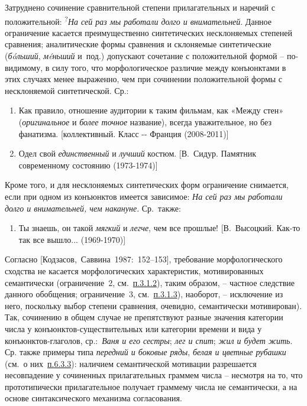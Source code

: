 Затруднено сочинение сравнительной степени прилагательных и наречий с
положительной: \textsuperscript{?}\emph{На сей раз мы работали долго и
внимательней}. Данное ограничение касается преимущественно синтетических
несклоняемых степеней сравнения; аналитические формы сравнения и
склоняемые синтетические (\emph{бóльший}, \emph{мéньший} и~под.)
допускают сочетание с положительной формой -- по-видимому, в силу того,
что морфологическое различие между конъюнктами в этих случаях менее
выраженно, чем при сочинении положительной формы с несклоняемой
синтетической. Ср.:

\begin{enumerate}
\def\labelenumi{(\arabic{enumi})}
\setcounter{enumi}{6}
\item
  Как правило, отношение аудитории к таким фильмам, как «Между стен»
  (\emph{оригинальное} и \emph{более точное} название), всегда
  уважительное, но без фанатизма. {[}коллективный. Класс -\/- Франция
  (2008-2011){]}
\item
  Одел свой \emph{единственный} и \emph{лучший} костюм. {[}В.~Сидур.
  Памятник современному состоянию (1973-1974){]}
\end{enumerate}

Кроме того, и для несклоняемых синтетических форм ограничение снимается,
если при одном из конъюнктов имеется зависимое: \emph{На сей раз мы
работали долго и внимательней, чем накануне}. Ср.~также:

\begin{enumerate}
\def\labelenumi{(\arabic{enumi})}
\setcounter{enumi}{8}
\item
  Ты знаешь, он такой \emph{мягкий} и \emph{легче}, чем все прошлые!
  {[}В.~Высоцкий. Как-то так все вышло... (1969-1970){]}
\end{enumerate}

Согласно {[}Кодзасов,~Саввина~1987:~152--153{]}, требование
морфологического сходства не касается морфологических характеристик,
мотивированных семантически (ограничение~2, см.~\underline{п.3.1.2}),
таким образом, -- частное следствие данного обобщения; ограничение~3,
см.~\underline{п.3.1.3}), наоборот, -- исключение из него, поскольку
выбор степени сравнения, очевидно, семантически мотивирован). Так,
сочинению в общем случае не препятствуют разные значения категории числа
у конъюнктов-существительных или категории времени и вида у
конъюнктов-глаголов, ср.:~\emph{Ваня и его сестры}; \emph{лег и спит};
\emph{жил и будет жить}. Ср. также примеры типа \emph{передний и боковые
ряды}, \emph{белая и цветные рубашки} (см.~о них~\underline{п.6.3.3}):
наличием семантической мотивации разрешается несовпадение у сочиненных
прилагательных граммем числа -- несмотря на то, что прототипически
прилагательное получает граммему числа не семантически, а на основе
синтаксического механизма согласования.

